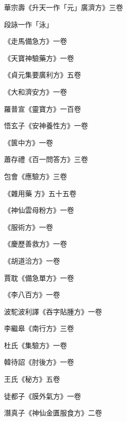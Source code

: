 \begin{pinyinscope}
 華宗壽《升天一作「元」廣濟方》三卷



 段詠一作「泳」



 《走馬備急方》一卷



 《天寶神驗藥方》一卷



 《貞元集要廣利方》五卷



 《大和濟安方》一卷



 羅普宣《靈寶方》一百卷



 悟玄子《安神養性方》一卷



 《篋中方》一卷



 蕭存禮《百一問答方》三卷



 包會《應驗方》三卷



 《雜用藥
 方》五十五卷



 《神仙雲母粉方》一卷



 《服術方》一卷



 《慶歷善救方》一卷



 《胡道洽方》一卷



 賈耽《備急單方》一卷



 《李八百方》一卷



 波駝波利譯《吞字貼腫方》一卷



 李繼皋《南行方》三卷



 杜氏《集驗方》一卷



 韓待詔《肘後方》一卷



 王氏《秘方》五卷



 徒都子《膜外氣方》一卷



 潛真子《神仙金匱服食方》二卷




\end{pinyinscope}
